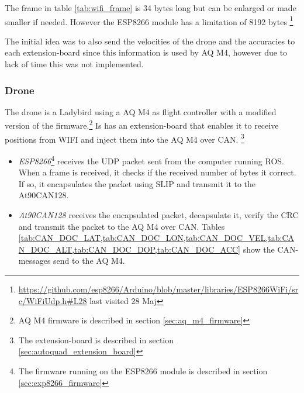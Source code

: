 The frame in table \ref{tab:wifi_frame} is 34 bytes long but can be enlarged or made smaller if needed. However the ESP8266 module has a limitation of 8192 bytes \footnote{\url{https://github.com/esp8266/Arduino/blob/master/libraries/ESP8266WiFi/src/WiFiUdp.h\#L28} last visited 28 Maj}

The initial idea was to also send the velocities of the drone and the accuracies to each extension-board since this information is used by AQ M4, however due to lack of time this was not implemented.

\subsubsection*{Drone} \label{sec:system_indoor_drone}
The drone is a Ladybird using a \ac{AQ} M4 as flight controller with a modified version of the firmware.\footnote{AQ M4 firmware is described in section \ref{sec:aq_m4_firmware}} Is has an extension-board that enables it to receive positions from WIFI and inject them into the \ac{AQ} M4 over \ac{CAN}. \footnote{The extension-board is described in section \ref{sec:autoquad_extension_board}}
\begin{itemize}
	\item \textit{ESP8266}\footnote{The firmware running on the ESP8266 module is described in section \ref{sec:exp8266_firmware}} receives the UDP packet sent from the computer running \ac{ROS}. When a frame is received, it checks if the received number of bytes it correct. If so, it encapsulates the packet using \ac{SLIP} and transmit it to the At90CAN128.
	\item \textit{At90CAN128} receives the encapsulated packet, decapsulate it, verify the CRC and transmit the packet to the \ac{AQ} M4 over \ac{CAN}. Tables \cref{tab:CAN_DOC_LAT,tab:CAN_DOC_LON,tab:CAN_DOC_VEL,tab:CAN_DOC_ALT,tab:CAN_DOC_DOP,tab:CAN_DOC_ACC} show the CAN-messages send to the \ac{AQ} M4.
\end{itemize}


